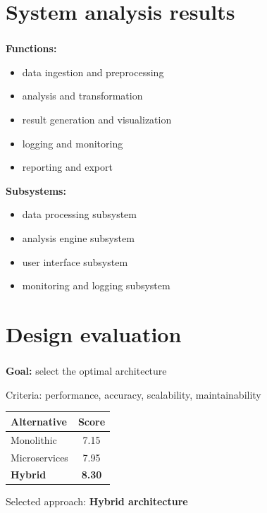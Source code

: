 
\section{System analysis results}

\begin{frame}
    \frametitle{\insertsection}

    \textbf{Functions:}
    \begin{itemize}
        \item data ingestion and preprocessing
        \item analysis and transformation
        \item result generation and visualization
        \item logging and monitoring
        \item reporting and export
    \end{itemize}

    \vspace{\baselineskip}

    \textbf{Subsystems:}
    \begin{itemize}
        \item data processing subsystem
        \item analysis engine subsystem
        \item user interface subsystem
        \item monitoring and logging subsystem
    \end{itemize}
\end{frame}


\section{Design evaluation}

\begin{frame}
    \frametitle{\insertsection}

    \textbf{Goal:} select the optimal architecture

    Criteria: performance, accuracy, scalability, maintainability

    \vspace{\baselineskip}

    \begin{tabular}{l S[table-format=1.2]}
        \toprule
        \textbf{Alternative} & {\textbf{Score}} \\
        \midrule
        Monolithic           & 7.15             \\
        Microservices        & 7.95             \\
        \textbf{Hybrid}      & \bfseries 8.30   \\
        \bottomrule
    \end{tabular}

    \vspace{\baselineskip}

    Selected approach: \textbf{Hybrid architecture}
\end{frame}

